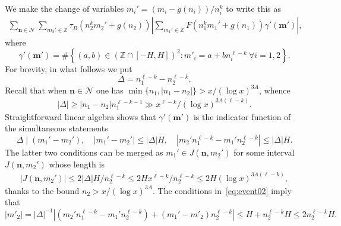\documentclass[11pt,letterpaper]{amsart}
\renewcommand{\leq}{\leqslant}
\renewcommand{\geq}{\geqslant}
\theoremstyle{definition}
\numberwithin{equation}{section}
\newcommand\Z{\mathbb{Z}}
\newcommand{\0}{\mathbf{0}}
\begin{document}
We make the change of variables $m_i'=(m_i-g(n_i))/n_i^k$ to write this as 
\begin{align}\label{eq:9equ10} 
 \sum_{\mathbf n \in \mathcal{N}}
 \sum_{m_2'\in \mathbb{Z}}\tau_{B}(n_2^km_2'+g(n_2))\left|\sum_{m_1'\in \mathbb{Z}}
F(n_1^{k}m_1'+g(n_1))
 \gamma'(\mathbf m ') \right|, 
 \end{align} 
 where 
$$ \gamma'(\mathbf m ') =\#\left\{(a,b) \in (\Z\cap [-H,H] )^2: 
m'_i=a +bn_i^{\ell-k}  \ \forall  i=1,2 \right\}.
$$
For brevity, in what follows we put
$$
\Delta =n_1^{\ell-k}-n_2^{\ell-k}.
$$
Recall that when  $\mathbf n \in \mathcal{N}$ one has    $\min\{n_1,|n_1-n_2|\}>x/(\log x)^{3A}$, whence
\begin{align}\label{eqq17}
|\Delta|\geq |n_1 -n_2| n_1^{\ell-k-1}
 \gg x^{\ell-k}/(\log x)^{3A(\ell-k)}.    
\end{align} Straightforward linear algebra shows that $ \gamma'(\mathbf m ')$ is the indicator function of the simultaneous statements 
\begin{equation}\label{eq:event02}
\Delta \mid (m_1'-m_2'),\quad
|m_1'-m_2'| \leq | \Delta| H,\quad 
|m_2'n_1^{\ell-k}-m_1'n_2^{\ell-k}| \leq  |\Delta| H.
\end{equation}
The  latter two conditions can be merged as $m_1'\in J(\mathbf n,m_2')$ for some interval $J(\mathbf n,m_2')$ whose length  is  
\begin{align}\label{eqq26}
|J(\mathbf n ,m_2')|\leq 2 |\Delta| H/ n_2^{\ell-k } 
\leq   2H x^{\ell-k}/n_2^{\ell-k}
\leq   2  H (\log x)^{3A(\ell-k)}
, 
\end{align} 
thanks to the bound
$n_2>x/(\log x)^{3A}$.  The conditions in~\eqref{eq:event02} imply that 
$$ | m'_2| =|\Delta|^{-1}
 |(m_2' n_1^{\ell-k} -m_1'n_2^{\ell-k} )   +(m_1'- m'_2) n_2^{\ell-k}  | \leq H +n_2^{\ell-k}  H\leq 2 n_2^{\ell-k}H.
$$
\end{document}
